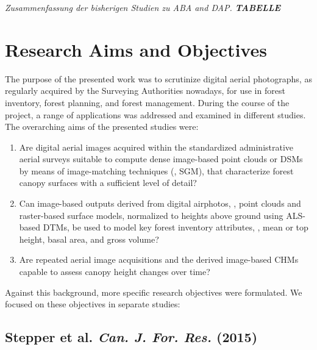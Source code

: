  
 
\medskip
\emph{Zusammenfassung der bisherigen Studien zu ABA and DAP. \textbf{TABELLE}}
\medskip















\section{Research Aims and Objectives}\label{sec:Objectives}

The purpose of the presented work was to scrutinize digital aerial photographs, as regularly acquired by the Surveying Authorities nowadays, 
for use in forest inventory, forest planning, and forest management. 
During the course of the project, a range of applications was addressed and examined in different studies. 
The overarching aims of the presented studies were:

\begin{enumerate}
		\item Are  digital aerial images acquired within the standardized
			administrative aerial surveys suitable to compute dense image-based point clouds
			or \acp{DSM} by means of image-matching techniques (\eg, \ac{SGM}), that characterize forest canopy surfaces with a sufficient level of detail?
		
		\item Can image-based outputs derived from digital airphotos, \ie, point clouds and raster-based surface models, 
			normalized to heights above ground using ALS-based \acp{DTM}, 
			be used to model key forest inventory attributes, \eg, mean or top height, basal area, and gross volume?
		
		\item Are repeated aerial image acquisitions and the derived image-based 
			\acp{CHM} capable to assess canopy height changes over time? 
\end{enumerate}

\noindent Against this background, more specific research objectives  were formulated. 
We focused on these objectives in separate studies:


\subsection*{Stepper et al. \emph{Can. J. For. Res.} (2015)}


